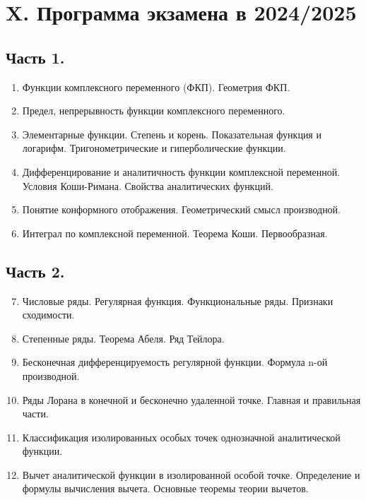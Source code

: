 \documentclass[12pt]{article}
\begin{document}

\clearpage

\section{X. Программа экзамена в 2024/2025}

\subsection{Часть 1.}

\begin{enumerate}
    \item Функции комплексного переменного (ФКП). Геометрия ФКП.
    \item Предел, непрерывность функции комплексного переменного.
    \item Элементарные функции. Степень и корень. Показательная функция и логарифм. Тригонометрические и гиперболические функции.
    \item Дифференцирование и аналитичность функции комплексной переменной. Условия Коши-Римана. Свойства аналитических функций.
    \item Понятие конформного отображения. Геометрический смысл производной.
    \item Интеграл по комплексной переменной. Теорема Коши. Первообразная.
\end{enumerate}

    

\subsection{Часть 2.}

\begin{enumerate}
    \setcounter{enumi}{6}

    \item Числовые ряды. Регулярная функция. Функциональные ряды. Признаки сходимости.
    \item Степенные ряды. Теорема Абеля. Ряд Тейлора.
    \item Бесконечная дифференцируемость регулярной функции. Формула n-ой производной.
    \item Ряды Лорана в конечной и бесконечно удаленной точке. Главная и правильная части.
    \item Классификация изолированных особых точек однозначной аналитической функции.
    \item Вычет аналитической функции в изолированной особой точке. Определение и формулы вычисления вычета. Основные теоремы теории вычетов.
\end{enumerate}
\end{document}
